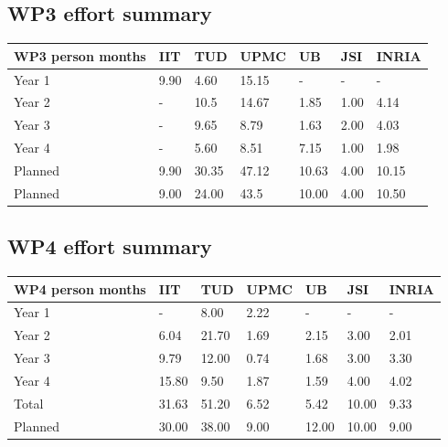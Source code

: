 \documentclass[12pt,a4paper,twoside]{article}
\begin{document}
\subsection{WP3 effort summary}
\begin{center}
\begin{tabular}{|C{1.5cm}|C{1.5cm}|C{1.5cm}|C{2cm}|C{2cm}|C{2cm}|C{2cm}|}
\hline
\footnotesize \textbf{WP3 person months} & \footnotesize \textbf{IIT}&\footnotesize \textbf{TUD}&\footnotesize \textbf{UPMC}& \footnotesize \textbf{UB} &\footnotesize \textbf{JSI} &\footnotesize \textbf{INRIA} \\ \hline
\footnotesize Year 1  &  9.90 & 4.60  & 15.15 & -    & -    &  -   \\  \hline
\footnotesize Year 2  &  -    & 10.5  & 14.67 & 1.85 & 1.00 & 4.14  \\  \hline
\footnotesize Year 3  &  -    & 9.65  & 8.79  & 1.63 & 2.00 & 4.03 \\  \hline
\footnotesize Year 4  & -     &  5.60 &  8.51 &  7.15  &  1.00  &  1.98    \\    \hline
\footnotesize Planned & 9.90 &  30.35 &  47.12 &  10.63 &  4.00 &  10.15    \\
\hline \hline
\footnotesize Planned &  9.00 & 24.00 & 43.5 & 10.00 & 4.00 & 10.50 \\ \hline
\end{tabular}
\end{center}


\subsection{WP4 effort summary}
\begin{center}
\begin{tabular}{|C{1.5cm}|C{1.5cm}|C{1.5cm}|C{2cm}|C{2cm}|C{2cm}|C{2cm}|}
\hline
\footnotesize \textbf{WP4 person months}& \footnotesize \textbf{IIT}&\footnotesize \textbf{TUD}&\footnotesize \textbf{UPMC}& \footnotesize \textbf{UB} &\footnotesize \textbf{JSI} &\footnotesize \textbf{INRIA}\\ \hline
\footnotesize Year 1  &  -        & 8.00   & 2.22 & -       & -        & -     \\  \hline
\footnotesize Year 2  &  6.04  & 21.70 & 1.69 & 2.15 & 3.00   & 2.01     \\  \hline
\footnotesize Year 3  &  9.79  & 12.00 & 0.74 & 1.68 & 3.00   & 3.30 \\  \hline
\footnotesize Year 4  & 15.80 &  9.50 &  1.87 &  1.59  &  4.00  &  4.02    \\  \hline
\footnotesize Total  & 31.63 &  51.20 &  6.52 &  5.42 &  10.00 &  9.33    \\
\hline \hline
\footnotesize Planned & 30.00 & 38.00 & 9.00 & 12.00&10.00 & 9.00 \\ \hline
\end{tabular}
\end{center}
\end{document}
